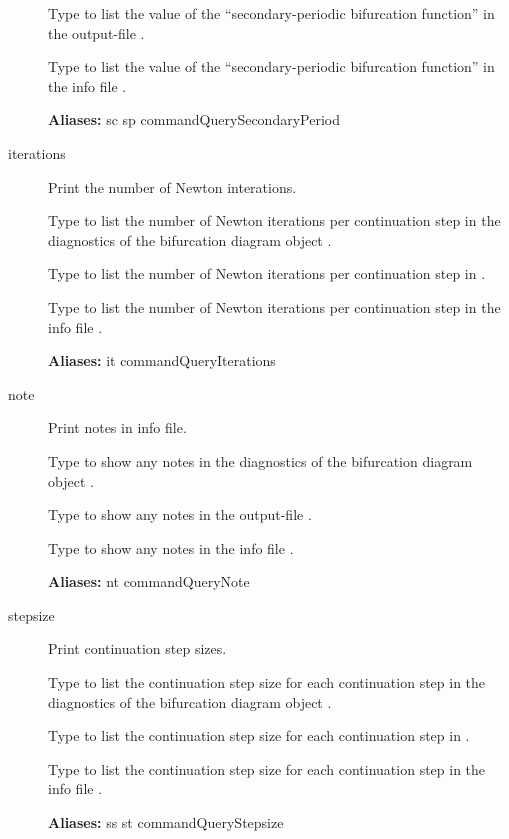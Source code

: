 \documentclass[12pt]{report}
\begin{document}
\begin{description}
    Type   to list the value of the
    ``secondary-periodic bifurcation function'' 
    in the output-file .

    Type  to list the value of the
    ``secondary-periodic bifurcation function''
    in the info file .
    
\textbf{Aliases:} sc sp commandQuerySecondaryPeriod

\item[iterations]
Print the number of Newton interations.

    Type  to list the number of Newton iterations per
    continuation step in the diagnostics of the bifurcation diagram
    object .

    Type  to list the number of Newton iterations per
    continuation step in . 

    Type  to list the number of Newton iterations per
    continuation step in the info file .
    
\textbf{Aliases:} it commandQueryIterations

\item[note]
Print notes in info file.

    Type  to show any notes 
    in the diagnostics of the bifurcation diagram
    object .

    Type  to show any notes in the output-file .

    Type  to show any notes  in the info file .
    
\textbf{Aliases:} nt commandQueryNote

\item[stepsize]
Print continuation step sizes.

    Type  to list the continuation step size for each
    continuation step in the diagnostics of the bifurcation diagram
    object .

    Type  to list the continuation step size for each
    continuation step in  . 

    Type  to list the continuation step size for each
    continuation step in the info file .
    
\textbf{Aliases:} ss st commandQueryStepsize


\end{description}
\end{document}
